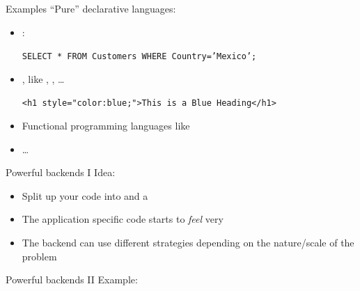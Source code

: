 \begin{frame}{Examples}
	\enquote{Pure} declarative languages:
	\begin{itemize}
		\item {} :
		\begin{center}
			\texttt{SELECT * FROM Customers WHERE Country='Mexico';}
		\end{center}
		\item {}, like ,  , \dots
		\begin{center}
			\texttt{<h1 style="color:blue;">This is a Blue Heading</h1>
			}
		\end{center}
		\item Functional programming languages like  
		\item \dots
\end{itemize}
\end{frame}
%
\begin{frame}{Powerful backends I}
	Idea:
	\begin{itemize}
		\item Split up your code into   and a  
		\item The application specific code starts to \emph{feel} very 
		\item The backend can use different strategies depending on the nature/scale of the problem
	\end{itemize}
\end{frame}
%
\begin{frame}{Powerful backends II}
	Example:
	\inputminted{python}{code/paradigms/dp/dataframes.py}
\end{frame}
%
%
